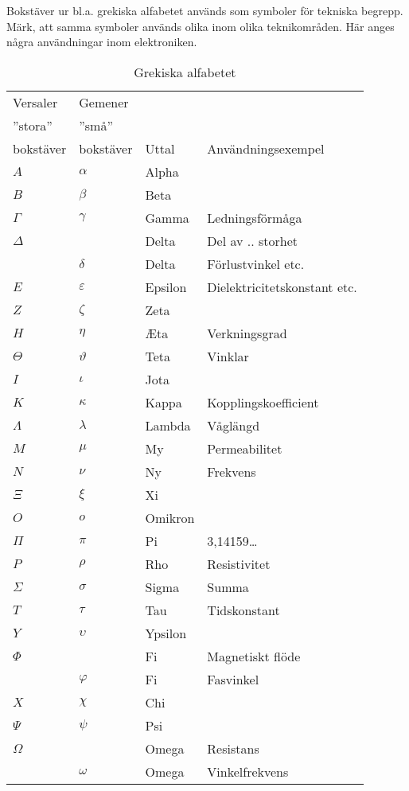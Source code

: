 \begin{table}
  \caption{Grekiska alfabetet}

  Bokstäver ur bl.a. grekiska alfabetet används som symboler för
  tekniska begrepp.  Märk, att samma symboler används olika inom olika
  teknikområden.  Här anges några användningar inom elektroniken.

  \begin{tabular}{ll|l|l}
    Versaler  & Gemener   &       & \\
    ''stora'' & ''små''   &       & \\
    bokstäver & bokstäver & Uttal & Användningsexempel \\
    \hline
    \(A\) & \(\alpha\) & Alpha & \\
    \(B\) & \(\beta\) & Beta & \\
    \(\Gamma\) & \(\gamma\) & Gamma & Ledningsförmåga \\
    \(\Delta\) & & Delta & Del av .. storhet \\
    & \(\delta\) & Delta & Förlustvinkel etc. \\
    \(E\) & \(\varepsilon\) & Epsilon & Dielektricitetskonstant etc.\\
    \(Z\) & \(\zeta\) & Zeta & \\
    \(H\) & \(\eta\) & \AE ta & Verkningsgrad\\
    \(\Theta\) & \(\vartheta\) & Teta & Vinklar \\
    \(I\) & \(\iota\) & Jota & \\
    \(K\) & \(\kappa\) & Kappa & Kopplingskoefficient \\
    \(\Lambda\) & \(\lambda\) & Lambda & Våglängd \\
    \(M\) & \(\mu\) & My & Permeabilitet \\
    \(N\) & \(\nu\) & Ny & Frekvens \\
    \(\Xi\) & \(\xi\) & Xi & \\
    \(O\) & \(o\) & Omikron & \\
    \(\Pi\) & \(\pi\) & Pi & 3,14159\dots \\
    \(P\) & \(\rho\) & Rho & Resistivitet \\
    \(\Sigma\) & \(\sigma\) & Sigma & Summa \\
    \(T\) & \(\tau\) & Tau & Tidskonstant \\
    \(Y\) & \(\upsilon\) & Ypsilon &  \\
    \(\Phi\) & & Fi & Magnetiskt flöde \\
    & \(\varphi\) & Fi & Fasvinkel \\
    \(X\) & \(\chi\) & Chi & \\
    \(\Psi\) & \(\psi\) & Psi & \\
    \(\Omega\) & & Omega & Resistans \\
    & \(\omega\) & Omega & Vinkelfrekvens \\
  \end{tabular}
\end{table}
